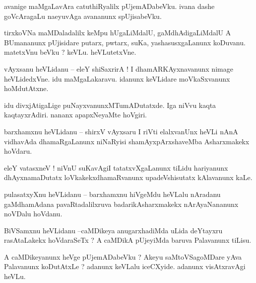 \documentclass{article}
\begin{document}
\begin{mng}%
avanige maMgaLavAra catuthiRyalilx pUjemADabeVku. ivana dashe goVcAragaLu naeyuvAga avananunx 
spUjisabeVku.
\end{mng}

\begin{mng}%
tirxkoVNa maMDaladalilx keMpu hUgaLiMdalU, gaMdhAdigaLiMdalU A BUmananunx pUjisidare putarx, 
pwtarx, suKa, yashasusxgaLanunx koDuvanu. matetxVnu beVku ? keVLu. heVLutetxVne.
\end{mng}

\begin{mng}%
vAyxsanu heVLidanu -- eleY shiSaxrirA ! I dhamARKAyxnavanunx nimage heVLidedxVne. idu 
maMgaLakaravu. idanunx keVLidare moVkaSxvanunx hoMdutAtxne.
\end{mng}

\begin{mng}%
idu divxjAtigaLige puNayxvanunxMTumADutatxde. Iga niVvu kaqta kaqtayxrAdiri. nananx apapxNeyaMte 
hoVgiri.
\end{mng}

\begin{mng}%
barxhamxnu heVLidanu -- shirxV vAyxsaru I riVti elalxvanUnx heVLi nAnA vidhavAda dhamaRgaLanunx 
niNaRyisi shamAyxpArxshaveMba Asharxmakekx hoVdaru.
\end{mng}

\begin{mng}%
eleY vatasxneV ! niVnU suKavAgiI tatatxvXgaLanunx tiLidu hariyanunx dhAyxnamaDutatx 
loVkakekxdhamaRvanunx upadeVshisutatx kAlavanunx kaLe.
\end{mng}

\begin{mng}%
pulasatxyXnu heVLidanu -- barxhamxnu hiVgeMdu heVLalu nAradanu gaMdhamAdana pavaRtadalilxruva 
badarikAsharxmakekx nArAyaNananunx noVDalu hoVdanu.
\end{mng}


\begin{mng}%
BiVSamxnu heVLidanu --caMDikeya anugarxhadiMda uLida deYtayxru rasAtaLakekx hoVdaraSeTx ? A 
caMDikA pUjeyiMda baruva Palavanunx tiLisu.
\end{mng}

\begin{mng}%
A caMDikeyanunx heVge pUjemADabeVku ? Akeyu saMtoVSagoMDare yAva Palavanunx koDutAtxLe ? adanunx 
keVLalu iceCXyide. adanunx visAtxravAgi heVLu.
\end{mng}
\end{document}
